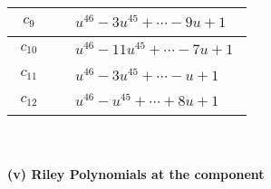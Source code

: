 \documentclass[1p]{elsarticle_modified}
\theoremstyle{definition}
\begin{document}
\begin{tabular}{m{50pt}|m{274pt}}
\hline $$\begin{aligned}c_{9}\end{aligned}$$&$\begin{aligned}
&u^{46}-3 u^{45}+\cdots-9 u+1
\end{aligned}$\\
\hline $$\begin{aligned}c_{10}\end{aligned}$$&$\begin{aligned}
&u^{46}-11 u^{45}+\cdots-7 u+1
\end{aligned}$\\
\hline $$\begin{aligned}c_{11}\end{aligned}$$&$\begin{aligned}
&u^{46}-3 u^{45}+\cdots- u+1
\end{aligned}$\\
\hline $$\begin{aligned}c_{12}\end{aligned}$$&$\begin{aligned}
&u^{46}- u^{45}+\cdots+8 u+1
\end{aligned}$\\
\hline
\end{tabular}\\~\\
\newpage\renewcommand{\arraystretch}{1}
\flushleft \textbf{(v) Riley Polynomials at the component}\newline \\
\end{document}

